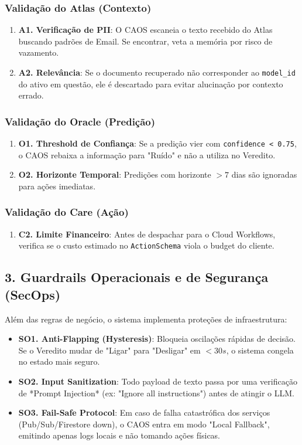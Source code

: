 \documentclass[12pt, a4paper]{article}
\begin{document}
\subsubsection{Validação do Atlas (Contexto)}
\begin{enumerate}
    \item \textbf{A1. Verificação de PII}: O CAOS escaneia o texto recebido do Atlas buscando padrões de Email. Se encontrar, veta a memória por risco de vazamento.
    \item \textbf{A2. Relevância}: Se o documento recuperado não corresponder ao \texttt{model\_id} do ativo em questão, ele é descartado para evitar alucinação por contexto errado.
\end{enumerate}

\subsubsection{Validação do Oracle (Predição)}
\begin{enumerate}
    \item \textbf{O1. Threshold de Confiança}: Se a predição vier com \texttt{confidence < 0.75}, o CAOS rebaixa a informação para "Ruído" e não a utiliza no Veredito.
    \item \textbf{O2. Horizonte Temporal}: Predições com horizonte $>7$ dias são ignoradas para ações imediatas.
\end{enumerate}

\subsubsection{Validação do Care (Ação)}
\begin{enumerate}
    \item \textbf{C2. Limite Financeiro}: Antes de despachar para o Cloud Workflows, verifica se o custo estimado no \texttt{ActionSchema} viola o budget do cliente.
\end{enumerate}

\subsection{3. Guardrails Operacionais e de Segurança (SecOps)}
Além das regras de negócio, o sistema implementa proteções de infraestrutura:

\begin{itemize}
    \item \textbf{SO1. Anti-Flapping (Hysteresis)}: Bloqueia oscilações rápidas de decisão. Se o Veredito mudar de "Ligar" para "Desligar" em $<30s$, o sistema congela no estado mais seguro.
    \item \textbf{SO2. Input Sanitization}: Todo payload de texto passa por uma verificação de *Prompt Injection* (ex: "Ignore all instructions") antes de atingir o LLM.
    \item \textbf{SO3. Fail-Safe Protocol}: Em caso de falha catastrófica dos serviços (Pub/Sub/Firestore down), o CAOS entra em modo "Local Fallback", emitindo apenas logs locais e não tomando ações físicas.
\end{itemize}
\end{document}
